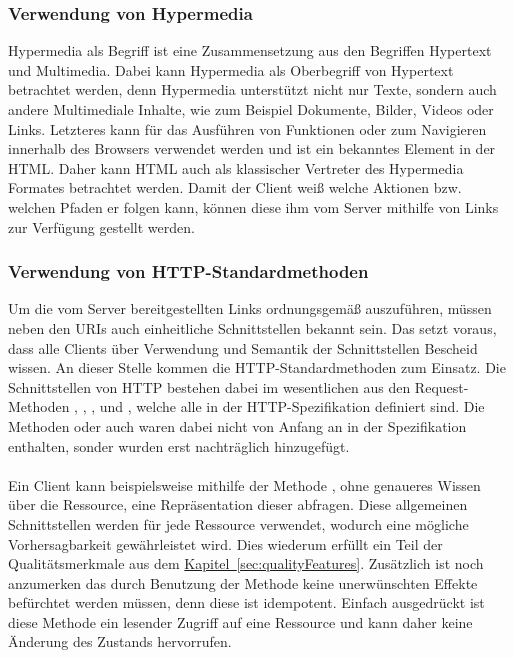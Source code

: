 \subsubsection{Verwendung von Hypermedia}
Hypermedia als Begriff ist eine Zusammensetzung aus den Begriffen Hypertext und Multimedia. Dabei kann Hypermedia als Oberbegriff von Hypertext betrachtet werden, denn Hypermedia unterstützt nicht nur Texte, sondern auch andere Multimediale Inhalte, wie zum Beispiel Dokumente, Bilder, Videos oder Links. Letzteres kann für das Ausführen von Funktionen oder zum Navigieren innerhalb des Browsers verwendet werden und ist ein bekanntes Element in der \gls{HTML}. Daher kann \gls{HTML} auch als klassischer Vertreter des Hypermedia Formates betrachtet werden. Damit der Client weiß welche Aktionen bzw. welchen Pfaden er folgen kann, können diese ihm vom Server mithilfe von Links zur Verfügung gestellt werden.

\subsubsection{Verwendung von HTTP-Standardmethoden}
Um die vom Server bereitgestellten Links ordnungsgemäß auszuführen, müssen neben den \glspl{URI} auch einheitliche Schnittstellen bekannt sein. Das setzt voraus, dass alle Clients über Verwendung und Semantik der Schnittstellen Bescheid wissen. An dieser Stelle kommen die \gls{HTTP}-Standardmethoden zum Einsatz. Die Schnittstellen von \gls{HTTP} bestehen dabei im wesentlichen aus den Request-Methoden , , ,  und , welche alle in der \gls{HTTP}-Spezifikation \cite{httpSpecification} definiert sind. Die Methoden  oder auch  waren dabei nicht von Anfang an in der Spezifikation enthalten, sonder wurden erst nachträglich hinzugefügt.\\
\\
Ein Client kann beispielsweise mithilfe der Methode , ohne genaueres Wissen über die Ressource, eine Repräsentation dieser abfragen. Diese allgemeinen Schnittstellen werden für jede Ressource verwendet, wodurch eine mögliche Vorhersagbarkeit gewährleistet wird. Dies wiederum erfüllt ein Teil der Qualitätsmerkmale aus dem \hyperref[sec:qualityFeatures]{Kapitel~\ref{sec:qualityFeatures}}. Zusätzlich ist noch anzumerken das durch Benutzung der Methode  keine unerwünschten Effekte befürchtet werden müssen, denn diese ist idempotent. Einfach ausgedrückt ist diese Methode ein lesender Zugriff auf eine Ressource und kann daher keine Änderung des Zustands hervorrufen.


